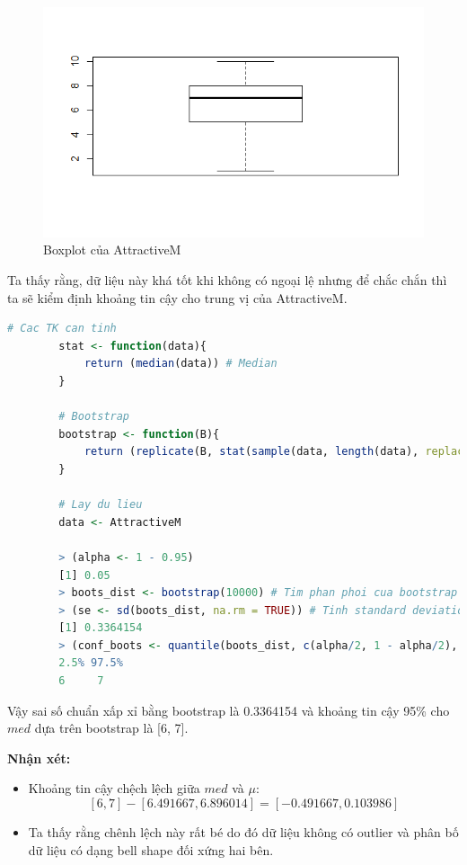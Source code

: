 \documentclass[a4paper,12pt]{article}
\begin{document}
\begin{enumerate}[label = \alph*)]
		\begin{figure}[H]
			\centering
			\includegraphics[width=0.7\linewidth]{Rplot2}
			\caption{Boxplot của AttractiveM}
			\label{fig:rplot2}
		\end{figure}
		
		Ta thấy rằng, dữ liệu này khá tốt khi không có ngoại lệ nhưng để chắc chắn thì ta sẽ kiểm định khoảng tin cậy cho trung vị của AttractiveM.
		
		\begin{lstlisting}[language=R]
		# Cac TK can tinh
		stat <- function(data){
			return (median(data)) # Median
		}
		
		# Bootstrap
		bootstrap <- function(B){
			return (replicate(B, stat(sample(data, length(data), replace = TRUE))))
		}
		
		# Lay du lieu
		data <- AttractiveM
		
		> (alpha <- 1 - 0.95)
		[1] 0.05
		> boots_dist <- bootstrap(10000) # Tim phan phoi cua bootstrap
		> (se <- sd(boots_dist, na.rm = TRUE)) # Tinh standard deviation (missing value se bi bo qua)
		[1] 0.3364154
		> (conf_boots <- quantile(boots_dist, c(alpha/2, 1 - alpha/2), na.rm = TRUE)) # Tim khoang tin cay cho median
		2.5% 97.5% 
		6     7
		\end{lstlisting}
		Vậy sai số chuẩn xấp xỉ bằng bootstrap là 0.3364154 và khoảng tin cậy 95\% cho $med$ dựa trên bootstrap
		là [6, 7].
	\end{enumerate}
	
	\textbf{Nhận xét:}
	\begin{itemize}
		\item Khoảng tin cậy chệch lệch giữa $med$ và $\mu$:
		$$[6, 7] - [6.491667, 6.896014] = [-0.491667, 0.103986]$$
		\item Ta thấy rằng chênh lệch này rất bé do đó dữ liệu không có outlier và phân bố dữ liệu có dạng bell shape đối xứng hai bên.
	\end{itemize}
\end{document}
